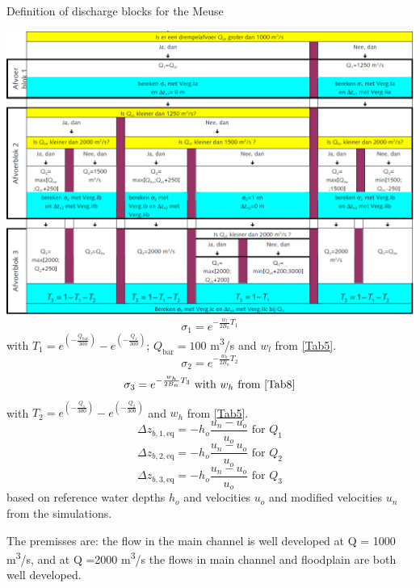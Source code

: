 \begin{table}
\caption{Definition of discharge blocks for the Meuse}
\label{Tab8}
\includegraphics[width=\columnwidth]{figures/Tab8.png}
%
\begin{equation}
\sigma_1 = e^{-\frac{w_l}{2 B_n} T_1}
\end{equation}
with $T_1 = e^{\left ( - \frac{Q_\text{bar}}{300} \right )} - e^{\left ( - \frac{Q_1}{300} \right )}$; $Q_\text{bar} = 100$ m\textsuperscript{3}/s and $w_l$ from \autoref{Tab5}.
%
\begin{equation}
\sigma_2 = e^{-\frac{w_h}{2 B_n} T_2}
\end{equation}
%
\begin{equation}
\sigma_3 = e^{-\frac{w_h}{2 B_n} T_3} \text{ with $w_h$ from \autoref{Tab8}}
\end{equation}
 with $T_2 = e^{\left ( - \frac{Q_1}{300} \right )} - e^{\left ( - \frac{Q_2}{300} \right )}$ and $w_h$ from \autoref{Tab5}.
%
\begin{equation}
\Delta z_{b,1,\text{eq}} = -h_o \frac{u_n - u_o}{u_o} \text{  for $Q_1$}
\end{equation}
%
\begin{equation}
\Delta z_{b,2,\text{eq}} = -h_o \frac{u_n - u_o}{u_o} \text{  for $Q_2$}
\end{equation}
%
\begin{equation}
\Delta z_{b,3,\text{eq}} = -h_o \frac{u_n - u_o}{u_o} \text{  for $Q_3$}
\end{equation}
based on reference water depths $h_o$ and velocities $u_o$ and modified velocities $u_n$ from the simulations.

The premisses are: the flow in the main channel is well developed at Q = 1000 m\textsuperscript{3}/s, and at Q  =2000 m\textsuperscript{3}/s the flows in main channel and floodplain are both well developed.
\end{table}
